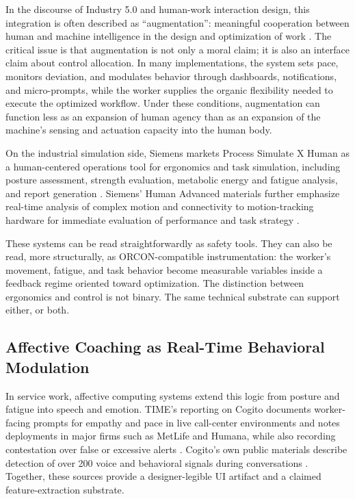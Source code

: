\documentclass[runningheads]{llncs}
\begin{document}
In the discourse of Industry 5.0 and human-work interaction design, this integration is often described as ``augmentation'': meaningful cooperation between human and machine intelligence in the design and optimization of work \cite{breque2021industry,hwid2026cfp}. The critical issue is that augmentation is not only a moral claim; it is also an interface claim about control allocation. In many implementations, the system sets pace, monitors deviation, and modulates behavior through dashboards, notifications, and micro-prompts, while the worker supplies the organic flexibility needed to execute the optimized workflow. Under these conditions, augmentation can function less as an expansion of human agency than as an expansion of the machine's sensing and actuation capacity into the human body.

On the industrial simulation side, Siemens markets Process Simulate X Human as a human-centered operations tool for ergonomics and task simulation, including posture assessment, strength evaluation, metabolic energy and fatigue analysis, and report generation \cite{siemensPSXHuman}. Siemens' Human Advanced materials further emphasize real-time analysis of complex motion and connectivity to motion-tracking hardware for immediate evaluation of performance and task strategy \cite{siemensHumanAdvanced}.

These systems can be read straightforwardly as safety tools. They can also be read, more structurally, as ORCON-compatible instrumentation: the worker's movement, fatigue, and task behavior become measurable variables inside a feedback regime oriented toward optimization. The distinction between ergonomics and control is not binary. The same technical substrate can support either, or both.

\subsection{Affective Coaching as Real-Time Behavioral Modulation}

In service work, affective computing systems extend this logic from posture and fatigue into speech and emotion. TIME's reporting on Cogito documents worker-facing prompts for empathy and pace in live call-center environments and notes deployments in major firms such as MetLife and Humana, while also recording contestation over false or excessive alerts \cite{delagarza2019time}. Cogito's own public materials describe detection of over 200 voice and behavioral signals during conversations \cite{cogito2023businesswire}. Together, these sources provide a designer-legible UI artifact and a claimed feature-extraction substrate.
\end{document}
